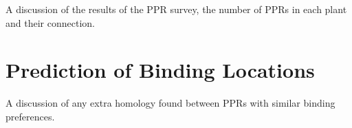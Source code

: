 A discussion of the results of the PPR survey, the number of PPRs in each plant
and their connection.

\section{Prediction of Binding Locations}

A discussion of any extra homology found between PPRs with similar binding
preferences.


